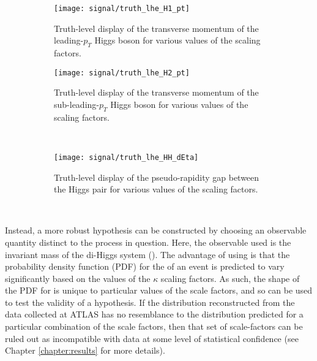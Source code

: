     \begin{figure}[tbh]
        \centering
        \begin{subfigure}{0.48\textwidth}
            \texttt{[image: signal/truth\_lhe\_H1\_pt]}
            \captionsetup{justification=centering} \caption{
                Truth-level display of the transverse momentum of the leading-$p_T$ Higgs boson
                    for various values of the scaling factors.
            }
        \end{subfigure}
        \begin{subfigure}{0.48\textwidth}
            \texttt{[image: signal/truth\_lhe\_H2\_pt]}
            \captionsetup{justification=centering} \caption{
                Truth-level display of the transverse momentum of the sub-leading-$p_T$ Higgs boson
                    for various values of the scaling factors.
            }
        \end{subfigure} \\

        \begin{subfigure}{0.48\textwidth}
            \texttt{[image: signal/truth\_lhe\_HH\_dEta]}
            \captionsetup{justification=centering} \caption{
                Truth-level display of the pseudo-rapidity gap between the Higgs pair
                    for various values of the scaling factors.
            }
        \end{subfigure} \\
        \caption{}
        \label{fig:lhe_truth2}
    \end{figure}

    Instead, a more robust hypothesis can be constructed by choosing an observable quantity distinct to the process in question.
    Here, the observable used is the invariant mass of the di-Higgs system (\mhh).
    The advantage of using \mhh is that the probability density function (PDF) for the \mhh of an event
        is predicted to vary significantly based on the values of the $\kappa$ scaling factors.
    As such, the shape of the PDF for \mhh is unique to particular values of the scale factors, 
        and so can be used to test the validity of a hypothesis.
    If the \mhh distribution reconstructed from the data collected at ATLAS has no resemblance to
        the \mhh distribution predicted for a particular combination of the scale factors,
        then that set of scale-factors can be ruled out as incompatible with data
        at some level of statistical confidence
        (see Chapter \ref{chapter:results} for more details).

